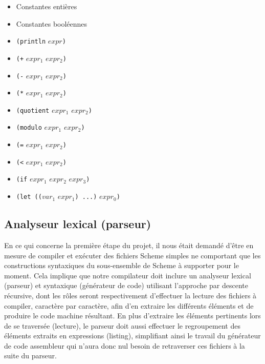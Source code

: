 \documentclass[12pt]{article}
\begin{document}
\begin{itemize}
\item Constantes entières
\item Constantes booléennes
\item \texttt{(println} $expr$\texttt{)}
\item \texttt{(+} $expr_1$ $expr_2$\texttt{)}
\item \texttt{(-} $expr_1$ $expr_2$\texttt{)}
\item \texttt{(*} $expr_1$ $expr_2$\texttt{)}
\item \texttt{(quotient} $expr_1$ $expr_2$\texttt{)}
\item \texttt{(modulo} $expr_1$ $expr_2$\texttt{)}
\item \texttt{(=} $expr_1$ $expr_2$\texttt{)}
\item \texttt{(<} $expr_1$ $expr_2$\texttt{)}
\item \texttt{(if} $expr_1$ $expr_2$ $expr_3$\texttt{)}
\item \texttt{(let ((}$var_1$ $expr_1$\texttt{) ...)} $expr_0$\texttt{)}
\end{itemize}

\subsection{Analyseur lexical (parseur)}
En ce qui concerne la première étape du projet, il nous était demandé d'être en mesure de compiler et exécuter des fichiers Scheme simples ne comportant que les constructions syntaxiques du sous-ensemble de Scheme à supporter pour le moment. Cela implique que notre compilateur doit inclure un analyseur lexical (parseur) et syntaxique (générateur de code) utilisant l'approche par descente récursive, dont les rôles seront respectivement d'effectuer la lecture des fichiers à compiler, caractère par caractère, afin d'en extraire les différents éléments et de produire le code machine résultant. En plus d'extraire les éléments pertinents lors de se traversée (lecture), le parseur doit aussi effectuer le regroupement des éléments extraits en expressions (listing), simplifiant ainsi le travail du générateur de code assembleur qui n'aura donc nul besoin de retraverser ces fichiers à la suite du parseur.
\end{document}
